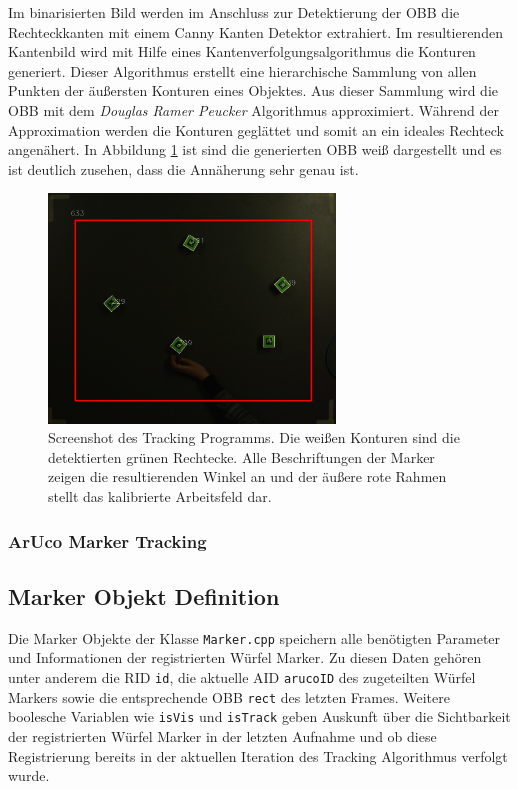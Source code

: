 Im binarisierten Bild werden im Anschluss zur Detektierung der OBB die Rechteckkanten mit einem Canny Kanten Detektor extrahiert\cite{article:Canny}. Im resultierenden Kantenbild wird mit Hilfe eines Kantenverfolgungsalgorithmus \cite{article:FindConturs} die Konturen generiert. Dieser Algorithmus erstellt eine hierarchische Sammlung von allen Punkten der äußersten Konturen eines Objektes. Aus dieser Sammlung wird die OBB mit dem \textit{Douglas Ramer Peucker} Algorithmus \cite{article:RamerPeucker} approximiert. Während der Approximation werden die Konturen geglättet und somit an ein ideales Rechteck angenähert. In Abbildung \ref{fig:DebugScreenshot} ist sind die generierten OBB weiß dargestellt und es ist deutlich zusehen, dass die Annäherung sehr genau ist.
\begin{figure}[H]
	\centering
	\includegraphics[width=3in]{Bilder/TrackingScreenshot_x.jpg}
	\caption{Screenshot des Tracking Programms. Die weißen Konturen sind die detektierten grünen Rechtecke. Alle Beschriftungen der Marker zeigen die resultierenden Winkel an und der äußere rote Rahmen stellt das kalibrierte Arbeitsfeld dar.}
	\label{fig:DebugScreenshot}
\end{figure}
\subsubsection{ArUco Marker Tracking}\label{sec:ArucoMarkerTracking}

\subsection{Marker Objekt Definition}\label{sec:MarkerObjekte}
Die Marker Objekte der Klasse \texttt{Marker.cpp} speichern alle benötigten Parameter und Informationen der registrierten Würfel Marker. Zu diesen Daten gehören unter anderem die RID \texttt{id}, die aktuelle AID \texttt{arucoID} des zugeteilten Würfel Markers sowie die entsprechende OBB \texttt{rect} des letzten Frames. Weitere boolesche Variablen wie \texttt{isVis} und \texttt{isTrack} geben Auskunft über die Sichtbarkeit der registrierten Würfel Marker in der letzten Aufnahme und ob diese Registrierung bereits in der aktuellen Iteration des Tracking Algorithmus verfolgt wurde.

